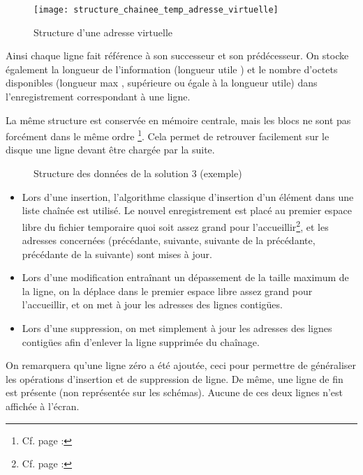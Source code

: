 \begin{figure}[H]
	\centering
	\caption{Structure d'une adresse virtuelle}
	\texttt{[image: structure\_chainee\_temp\_adresse\_virtuelle]}
\end{figure}

Ainsi chaque ligne fait référence à son successeur et son prédécesseur. On stocke également la longueur de l'information (\og longueur utile \fg) et le nombre d'octets disponibles (\og longueur max \fg, supérieure ou égale à la longueur utile) dans l'enregistrement correspondant à une ligne.

La même structure est conservée en mémoire centrale, mais les blocs ne sont pas forcément dans le même ordre \footnote{Cf. page \pageref{subsec:gestionblocs} : \og{}\fg}. Cela permet de retrouver facilement sur le disque une ligne devant être chargée par la suite.

\begin{figure}[H]
	\centering
	\caption{Structure des données de la solution 3 (exemple)}
\end{figure}

\begin{itemize}
	\item Lors d'une insertion, l'algorithme classique d'insertion d'un élément dans une liste chaînée est utilisé. Le nouvel enregistrement est placé au premier espace libre du fichier temporaire quoi soit assez grand pour l'accueillir\footnote{Cf. page \pageref{subsec:gestionespacelibre} : \og{}\fg}, et les adresses concernées (précédante, suivante, suivante de la précédante, précédante de la suivante) sont mises à jour.
	\item Lors d'une modification entraînant un dépassement de la taille maximum de la ligne, on la déplace dans le premier espace libre assez grand pour l'accueillir, et on met à jour les adresses des lignes contigües.
	\item Lors d'une suppression, on met simplement à jour les adresses des lignes contigües afin d'enlever la ligne supprimée du chaînage.
\end{itemize}

On remarquera qu'une ligne \og zéro \fg a été ajoutée, ceci pour permettre de généraliser les opérations d'insertion et de suppression de ligne. De même, une ligne de \og fin \fg est présente (non représentée sur les schémas). Aucune de ces deux lignes n'est affichée à l'écran.


